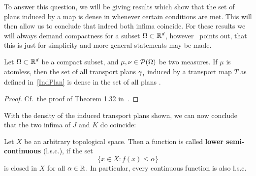 To answer this question, we will be giving results which show that the set of plans induced by a map is dense in  whenever certain conditions are met. This will then allow us to conclude that indeed both infima coincide. For these results we will always demand compactness for a subset $\Omega \subset \mathbb{R}^d$, however~\cite{San2015} points out, that this is just for simplicity and more general statements may be made.

	


\begin{theorem}\label{IndPlansDense}
	Let $\Omega \subset \mathbb{R}^d$ be a compact subset, and $\mu, \nu \in \mathcal{P}(\Omega)$ be two measures. If $\mu$ is atomless, then the set of all transport plans $\gamma_T$ induced by a transport map $T$ as defined in~\ref{IndPlan} is dense in the set of all plans \TP{\mu}{\nu}.
\end{theorem}

\begin{proof}
	Cf.~the proof of Theorem 1.32 in~\cite{San2015}.
\end{proof}

With the density of the induced transport plans shown, we can now conclude that the two infima of $J$ and $K$ do coincide:

\begin{definition}\label{lsc}
	Let $X$ be an arbitrary topological space. Then a function  is called \textbf{lower semi-continuous} (l.s.c.), if the set
	\[ \{ x \in X : f(x) \le \alpha \} \]
	is closed in $X$ for all $\alpha \in \mathbb{R}$. In particular, every continuous function  is also l.s.c.
\end{definition}

